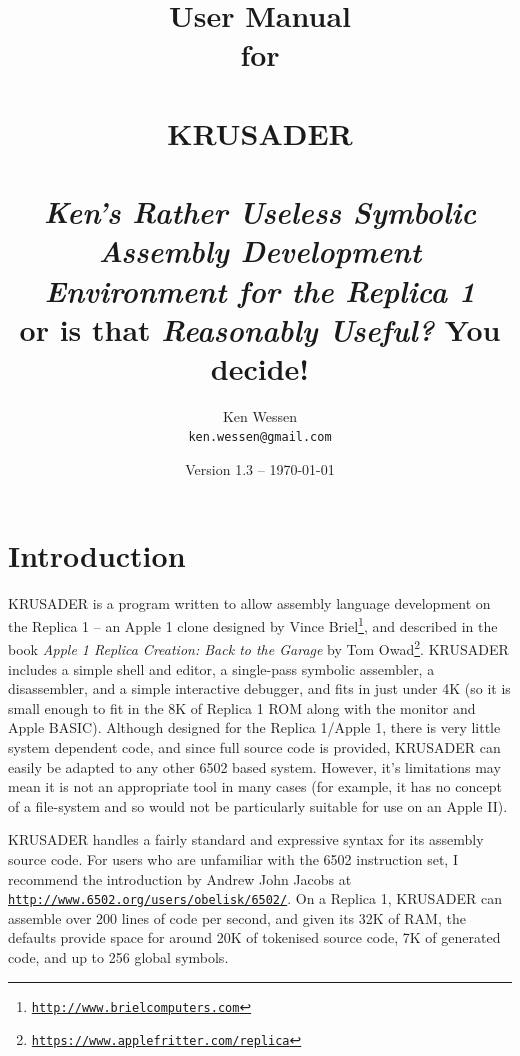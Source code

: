 \documentclass[12pt]{article}
\newcommand{\krusader}{\textsf{KRUSADER}\xspace}
\renewcommand{\url}[1]{\href{#1}{\texttt{#1}}}
\begin{document}
\title{User Manual \\ for \\ {~} \\ \Huge \krusader \normalsize \\ {~} \\
\textit{Ken's Rather Useless Symbolic Assembly Development Environment for the Replica 1}\\
or is that \textit{Reasonably Useful?}  You decide!}

\author{Ken Wessen \\ \texttt{ken.wessen@gmail.com} }
\date{Version 1.3 -- \today}
\maketitle

\section{Introduction}

\krusader is a program written to allow assembly language development on the Replica 1 -- an Apple 1 clone designed by Vince Briel\footnote{\url{http://www.brielcomputers.com}}, and described in the book \textit{Apple 1 Replica Creation: Back to the Garage} by Tom Owad\footnote{\url{https://www.applefritter.com/replica}}.
\krusader includes a simple shell and editor, a single-pass symbolic assembler, a disassembler, and a simple interactive debugger, and fits in just under 4K (so it is
small enough to fit in the 8K of Replica 1 ROM along with the monitor and Apple BASIC).  
Although designed for the Replica 1/Apple 1, there is very little system dependent code, and since full source code is provided, \krusader can easily be adapted to any other 6502 based system.  However, it's limitations may mean it is not an appropriate tool in many cases (for example, it has no concept of a file-system and so would not be particularly suitable for use on an Apple II).

\krusader handles a fairly standard and expressive syntax for its assembly source code.  
For users who are unfamiliar with the 6502 instruction set, I recommend the introduction by Andrew John Jacobs at \url{http://www.6502.org/users/obelisk/6502/}.  
On a Replica 1, \krusader can assemble over 200 lines of code per second, and given its 32K of RAM, the defaults provide space for around 20K of tokenised source code, 7K of generated code, and up to 256 global symbols.
\end{document}
